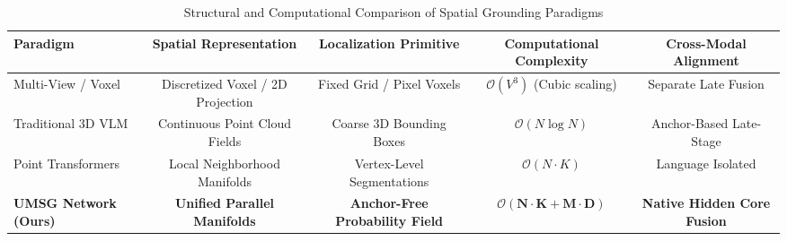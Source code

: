 \begin{table}[t!]
\centering
\caption{Structural and Computational Comparison of Spatial Grounding Paradigms}
\label{tab:table1_related_work_comparison}
\begin{tabular*}{\textwidth}{l@{\extracolsep{\fill}}cccc}
\toprule
\textbf{Paradigm} & \textbf{Spatial Representation} & \textbf{Localization Primitive} & \textbf{Computational Complexity} & \textbf{Cross-Modal Alignment} \\
\midrule
Multi-View / Voxel  & Discretized Voxel / 2D Projection & Fixed Grid / Pixel Voxels & $\mathcal{O}(V^3)$ (Cubic scaling) & Separate Late Fusion \\
Traditional 3D VLM  & Continuous Point Cloud Fields     & Coarse 3D Bounding Boxes  & $\mathcal{O}(N \log N)$           & Anchor-Based Late-Stage \\
Point Transformers  & Local Neighborhood Manifolds     & Vertex-Level Segmentations & $\mathcal{O}(N \cdot K)$          & Language Isolated \\
\midrule
\textbf{UMSG Network (Ours)} & \textbf{Unified Parallel Manifolds} & \textbf{Anchor-Free Probability Field} & $\mathbf{\mathcal{O}(N \cdot K + M \cdot D)}$ & \textbf{Native Hidden Core Fusion} \\
\bottomrule
\end{tabular*}
\end{table}
